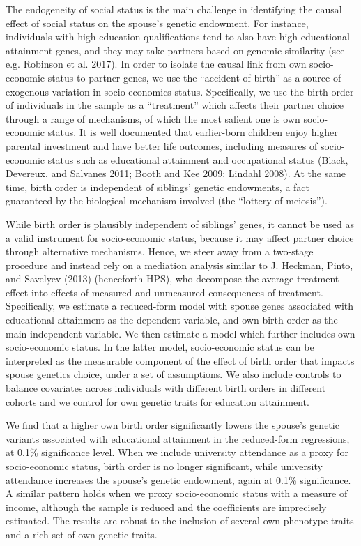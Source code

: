 \documentclass[
]{article}
\begin{document}
The endogeneity of social status is the main challenge in identifying the causal
effect of social status on the spouse's genetic endowment. For instance,
individuals with high education qualifications tend to also have high
educational attainment genes, and they may take partners based on genomic
similarity (see e.g. Robinson et al. 2017). In order to isolate the causal link
from own socio-economic status to partner genes, we use the ``accident of birth''
as a source of exogenous variation in socio-economics status. Specifically, we
use the birth order of individuals in the sample as a ``treatment'' which affects
their partner choice through a range of mechanisms, of which the most salient
one is own socio-economic status. It is well documented that earlier-born
children enjoy higher parental investment and have better life outcomes,
including measures of socio-economic status such as educational attainment and
occupational status (Black, Devereux, and Salvanes 2011; Booth and Kee 2009; Lindahl 2008). At the
same time, birth order is independent of siblings' genetic endowments, a fact
guaranteed by the biological mechanism involved (the ``lottery of meiosis'').

While birth order is plausibly independent of siblings' genes, it cannot be used
as a valid instrument for socio-economic status, because it may affect partner
choice through alternative mechanisms. Hence, we steer away from a two-stage
procedure and instead rely on a mediation analysis similar to
J. Heckman, Pinto, and Savelyev (2013) (henceforth HPS), who decompose the average treatment
effect into effects of measured and unmeasured consequences of treatment.
Specifically, we estimate a reduced-form model with spouse genes associated with
educational attainment as the dependent variable, and own birth order as the
main independent variable. We then estimate a model which further includes own
socio-economic status. In the latter model, socio-economic status can be
interpreted as the measurable component of the effect of birth order that
impacts spouse genetics choice, under a set of assumptions. We also include
controls to balance covariates across individuals with different birth orders in
different cohorts and we control for own genetic traits for education
attainment.

We find that a higher own birth order significantly lowers the spouse's genetic
variants associated with educational attainment in the reduced-form regressions,
at 0.1\% significance level. When we include university attendance as a proxy for
socio-economic status, birth order is no longer significant, while university
attendance increases the spouse's genetic endowment, again at 0.1\% significance.
A similar pattern holds when we proxy socio-economic status with a measure of
income, although the sample is reduced and the coefficients are imprecisely
estimated. The results are robust to the inclusion of several own phenotype
traits and a rich set of own genetic traits.
\end{document}
